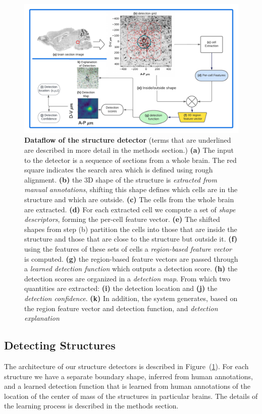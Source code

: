 \documentclass[11pt]{article}
\begin{document}
\begin{figure}[t]
  \includegraphics[width=\textwidth]{figures/detection.pdf}
  \caption{\label{fig:detector} {\bf Dataflow of the structure
      detector} (terms that are underlined are described in more
    detail in the methods section.) {\bf (a)} The input to the detector
    is a sequence of sections from a whole brain. The red square
    indicates the search area which is defined using rough
    alignment. {\bf (b)} the 3D shape of the structure is {\em
      extracted from manual annotations},
    shifting this shape defines which cells are in the structure and
    which are outside. {\bf (c)} The cells from the whole brain are
    extracted. {\bf (d)} For each extracted cell we compute a set of
    {\em shape descriptors}, forming the per-cell feature vector. {\bf (e)}
    The shifted shapes from step (b) partition the cells into those
    that are inside the structure and those that are close to the
    structure but outside it. {\bf (f)} using the features of these
    sets of cells a {\em region-based feature vector} is
    computed. {\bf (g)} the region-based feature vectors are passed
    through a {\em learned detection function} which outputs a
    detection score. {\bf (h)} the detection scores are organized in
    a {\em detection map}. From which two quantities are extracted:
    {\bf (i)} the detection location and {\bf (j)} the {\em detection
      confidence}. {\bf (k)} In addition, the system generates, based on the
    region feature vector and detection function, and {\em detection
      explanation}}
\end{figure}

\subsection{Detecting Structures}
The architecture of our structure detectors is described in
Figure~(\ref{fig:detector}). For each structure we have a separate
boundary shape, inferred from human annotations, and a learned
detection function that is learned from human annotations of the
location of the center of mass of the structures in particular
brains. The details of the learning process is described in the
methods section.
\end{document}
